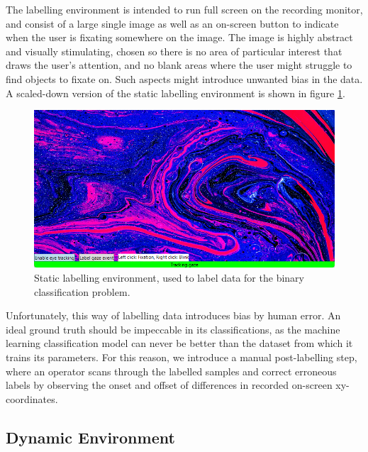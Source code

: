 The labelling environment is intended to run full screen on the recording monitor, and consist of a large single image as well as an on-screen button to indicate when the user is fixating somewhere on the image. The image is highly abstract and visually stimulating, chosen so there is no area of particular interest that draws the user's attention, and no blank areas where the user might struggle to find objects to fixate on. Such aspects might introduce unwanted bias in the data. A scaled-down version of the static labelling environment is shown in figure \ref{fig:meth_StaticLabellingEnv}.

\begin{figure}[h]
    \centering
    \includegraphics[width=\textwidth]{Images/Labelling/StaticEnvironment2.png}
    \caption{Static labelling environment, used to label data for the binary classification problem.}
    \label{fig:meth_StaticLabellingEnv}
\end{figure}

Unfortunately, this way of labelling data introduces bias by human error. An ideal ground truth should be impeccable in its classifications, as the machine learning classification model can never be better than the dataset from which it trains its parameters. For this reason, we introduce a manual post-labelling step, where an operator scans through the labelled samples and correct erroneous labels by observing the onset and offset of differences in recorded on-screen xy-coordinates.

\subsection{Dynamic Environment}


